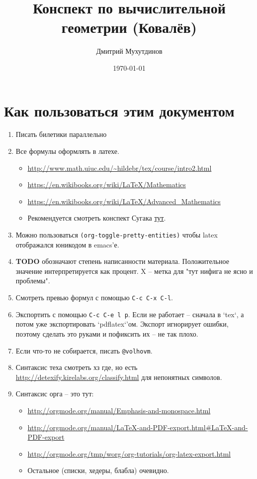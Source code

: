 \documentclass[11pt]{article}
\author{Дмитрий Мухутдинов}
\date{\today}
\title{Конспект по вычислительной геометрии (Ковалёв)}
\begin{document}
\maketitle
\tableofcontents


\section{Как пользоваться этим документом}
\label{sec:orgheadline1}
\begin{enumerate}
\item Писать билетики параллельно
\item Все формулы оформлять в латехе.
\begin{itemize}
\item \url{http://www.math.uiuc.edu/~hildebr/tex/course/intro2.html}
\item \url{https://en.wikibooks.org/wiki/LaTeX/Mathematics}
\item \url{https://en.wikibooks.org/wiki/LaTeX/Advanced_Mathematics}
\item Рекомендуется смотреть конспект Сугака \href{https://github.com/sugakandrey/Functional-analysis/blob/master/hahnbanach.tex}{тут}.
\end{itemize}
\item Можно пользоваться \texttt{(org-toggle-pretty-entities)} чтобы latex
отображался юникодом в emacs'е.
\item \textbf{TODO} обозначают степень написанности материала. Положительное
значение интерпретируется как процент. X -- метка для "тут нифига
не ясно и проблемы".
\item Смотреть превью формул с помощью \texttt{C-c C-x C-l}.
\item Экспортить с помощью \texttt{C-c C-e l p}. Если не работает -- сначала в
`tex`, а потом уже экспортировать `pdflatex`'ом. Экспорт
игнорирует ошибки, поэтому сделать это руками и пофиксить их --
не так плохо.
\item Если что-то не собирается, писать \texttt{@volhovm}.
\item Синтаксис теха смотреть хз где, но есть
\url{http://detexify.kirelabs.org/classify.html} для непонятных
символов.
\item Синтаксис орга -- это тут:
\begin{itemize}
\item \url{http://orgmode.org/manual/Emphasis-and-monospace.html}
\item \url{http://orgmode.org/manual/LaTeX-and-PDF-export.html#LaTeX-and-PDF-export}
\item \url{http://orgmode.org/tmp/worg/org-tutorials/org-latex-export.html}
\item Остальное (списки, хедеры, блабла) очевидно.
\end{itemize}
\end{enumerate}
\end{document}

